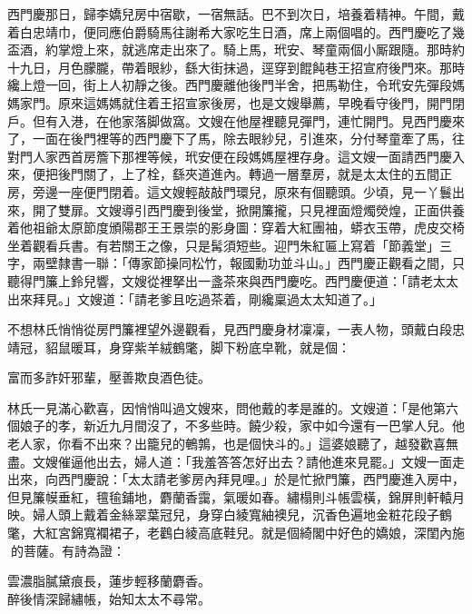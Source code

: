 西門慶那日，歸李嬌兒房中宿歇，一宿無話。巴不到次日，培養着精神。{}午間，戴着白忠靖巾，便同應伯爵騎馬往謝希大家吃生日酒，席上兩個唱的。西門慶吃了幾盃酒，約掌燈上來，就逃席走出來了。騎上馬，玳安、琴童兩個小厮跟隨。那時約十九日，月色朦朧，帶着眼紗，繇大街抹過，逕穿到餛飩巷王招宣府後門來。那時纔上燈一回，街上人初靜之後。西門慶離他後門半舍，把馬勒住，令玳安先彈段媽媽家門。原來這媽媽就住着王招宣家後房，也是文嫂舉薦，早晚看守後門，開門閉戶。但有入港，在他家落脚做窩。文嫂在他屋裡聽見彈門，連忙開門。見西門慶來了，一面在後門裡等的西門慶下了馬，除去眼紗兒，引進來，分付琴童牽了馬，往對門人家西首房簷下那裡等候，玳安便在段媽媽屋裡存身。這文嫂一面請西門慶入來，便把後門關了，上了栓，繇夾道進內。轉過一層羣房，就是太太住的五間正房，旁邊一座便門閉着。這文嫂輕敲敲門環兒，原來有個聽頭。少頃，見一丫鬟出來，開了雙扉。文嫂導引西門慶到後堂，掀開簾攏，只見裡面燈燭熒煌，正面供養着他祖爺太原節度頒陽郡王王景崇的影身圖：穿着大紅團袖，蟒衣玉帶，虎皮交椅坐着觀看兵書。有若關王之像，{}只是髯須短些。迎門朱紅匾上寫着「節義堂」三字，兩壁隸書一聯：「傳家節操同松竹，{}報國勳功並斗山。」西門慶正觀看之間，只聽得門簾上鈴兒響，文嫂從裡拏出一盞茶來與西門慶吃。西門慶便道：「請老太太出來拜見。」文嫂道：「請老爹且吃過茶着，剛纔稟過太太知道了。」

不想林氏悄悄從房門簾裡望外邊觀看，見西門慶身材凜凜，一表人物，頭戴白段忠靖冠，貂鼠暖耳，身穿紫羊絨鶴氅，脚下粉底皁靴，就是個：

\begin{myquote} 
富而多詐奸邪輩，壓善欺良酒色徒。
\end{myquote} 

林氏一見滿心歡喜，因悄悄叫過文嫂來，問他戴的孝是誰的。文嫂道：「是他第六個娘子的孝，新近九月間沒了，不多些時。饒少殺，家中如今還有一巴掌人兒。他老人家，你看不出來？出籠兒的鵪鶉，也是個快斗的。」{}這婆娘聽了，越發歡喜無盡。文嫂催逼他出去，婦人道：「我羞答答怎好出去？請他進來見罷。」{}文嫂一面走出來，向西門慶說：「太太請老爹房內拜見哩。」於是忙掀門簾，西門慶進入房中，但見簾幙垂紅，氊毺鋪地，麝蘭香靄，氣暖如春。繡榻則斗帳雲橫，錦屏則軒轅月映。婦人頭上戴着金絲翠葉冠兒，身穿白綾寬紬襖兒，沉香色遍地金粧花段子鶴氅，大紅宮錦寬襴裙子，老鸛白綾高底鞋兒。就是個綺閣中好色的嬌娘，深閨內施𣭈的菩薩。有詩為證：

\begin{myquote} 
雲濃脂膩黛痕長，蓮步輕移蘭麝香。\\
醉後情深歸繡帳，始知太太不尋常。{}
\end{myquote} 


